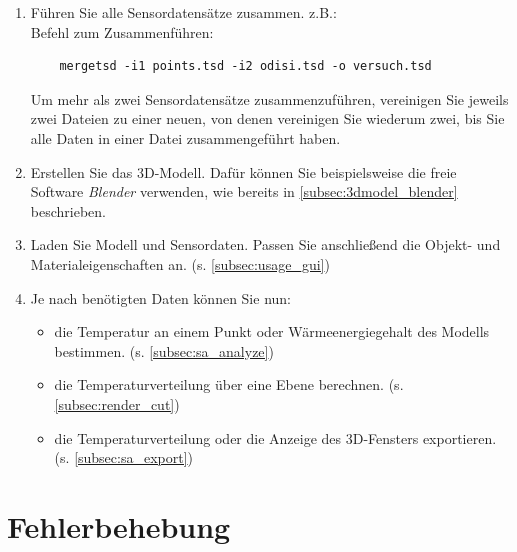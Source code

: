 \documentclass[10pt,a5paper,twoside,titlepage]{scrartcl}
\begin{document}
\begin{enumerate}
	\item Führen Sie alle Sensordatensätze zusammen. z.B.:\\
	Befehl zum Zusammenführen:
	\begin{lstlisting}
	mergetsd -i1 points.tsd -i2 odisi.tsd -o versuch.tsd
	\end{lstlisting}	
	Um mehr als zwei Sensordatensätze zusammenzuführen, vereinigen Sie jeweils zwei Dateien zu einer neuen, von denen vereinigen Sie wiederum zwei, bis Sie alle Daten in einer Datei zusammengeführt haben.
	\item Erstellen Sie das 3D-Modell. Dafür können Sie beispielsweise die freie Software \emph{Blender} verwenden, wie bereits in \ref{subsec:3dmodel_blender} beschrieben.
	\item Laden Sie Modell und Sensordaten. Passen Sie anschließend die Objekt- und Materialeigenschaften an. (s. \ref{subsec:usage_gui})
	\item Je nach benötigten Daten können Sie nun:
	\begin{itemize}
	\item die Temperatur an einem Punkt oder Wärmeenergiegehalt des Modells bestimmen. (s. \ref{subsec:sa_analyze})
	\item die Temperaturverteilung über eine Ebene berechnen. (s. \ref{subsec:render_cut})
	\item die Temperaturverteilung oder die Anzeige des 3D-Fensters exportieren. (s. \ref{subsec:sa_export})
	\end{itemize}
	\end{enumerate}
	\label{sec:example}
	
\section{Fehlerbehebung}
\end{document}
